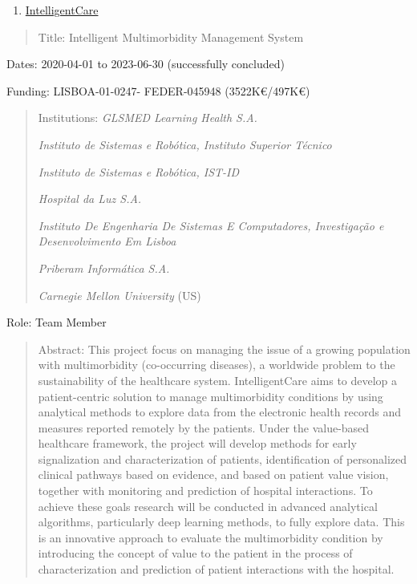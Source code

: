 \begin{enumerate}
\def\labelenumi{\arabic{enumi}.}
\setcounter{enumi}{2}
\item
  \ul{IntelligentCare}
\end{enumerate}

\begin{quote}
Title: Intelligent Multimorbidity Management System
\end{quote}

Dates: 2020-04-01 to 2023-06-30 (successfully concluded)

Funding: LISBOA-01-0247- FEDER-045948 (3522K€/497K€)

\begin{quote}
Institutions: \emph{GLSMED Learning Health S.A.}

\emph{Instituto de Sistemas e Robótica, Instituto Superior Técnico}

\emph{Instituto de Sistemas e Robótica, IST-ID}

\emph{Hospital da Luz S.A.}

\emph{Instituto De Engenharia De Sistemas E Computadores, Investigação e
Desenvolvimento Em Lisboa}

\emph{Priberam Informática S.A.}

\emph{Carnegie Mellon University} (US)
\end{quote}

Role: Team Member

\begin{quote}
Abstract: This project focus on managing the issue of a growing
population with multimorbidity (co-occurring diseases), a worldwide
problem to the sustainability of the healthcare system. IntelligentCare
aims to develop a patient-centric solution to manage multimorbidity
conditions by using analytical methods to explore data from the
electronic health records and measures reported remotely by the
patients. Under the value-based healthcare framework, the project will
develop methods for early signalization and characterization of
patients, identification of personalized clinical pathways based on
evidence, and based on patient value vision, together with monitoring
and prediction of hospital interactions. To achieve these goals research
will be conducted in advanced analytical algorithms, particularly deep
learning methods, to fully explore data. This is an innovative approach
to evaluate the multimorbidity condition by introducing the concept of
value to the patient in the process of characterization and prediction
of patient interactions with the hospital.
\end{quote}

